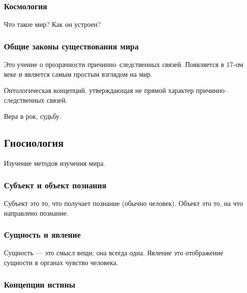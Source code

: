 \hrulefill

\subsubsection{Космология}

Что такое мир? Как он устроен?

\subsubsection{Общие законы существования мира}

\begin{definition}[Детерминизм]
	Это учение о прозрачности причинно--след\-ствен\-ных связей.
	Появляется в 17-ом веке и является самым простым взглядом на мир.
\end{definition}

\begin{definition}[Индетерминизм]
	Онтологическая концепций, утверждающая не прямой характер
	причинно--следственных связей.
\end{definition}

\begin{definition}[Фатализм]
	Вера в рок, судьбу.
\end{definition}

\subsection{Гносиология}

\begin{definition}[Гносиология]
	Изучение методов изучения мира.
\end{definition}

\subsubsection{Субъект и объект познания}

Субъект это то, что получает познание (обычно человек). Объект это то, на что
направлено познание.

\subsubsection{Сущность и явление}

Сущность --- это смысл вещи; она всегда одна. Явление это отображение сущности в
органах чувство человека.

\subsubsection{Концепции истины}

